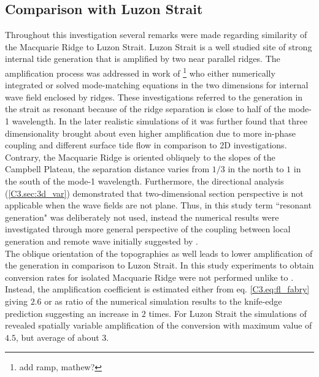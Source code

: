 \documentclass[12pt]{article}
\begin{document}
\subsection{Comparison with Luzon Strait}
\label{C3.sec:disc_luzon}
Throughout this investigation several remarks were made regarding similarity of the Macquarie Ridge 
to Luzon Strait. Luzon Strait is a well studied site of strong internal tide generation that is 
amplified by two near parallel ridges. The amplification process was addressed in work of 
\citep{buijsman2012double, klymak2013parameterizing}\footnote{add ramp, mathew?} who either 
numerically integrated or solved mode-matching equations in the two dimensions for internal wave 
field enclosed by ridges. These  
investigations referred to the generation in the strait as resonant because of the ridge separation 
is close to half of the mode-1 wavelength. In the later realistic simulations 
of \citep{buijsman2014three} it was further found that three dimensionality brought about even 
higher amplification due to more in-phase coupling and different surface tide flow in comparison to 
2D investigations. Contrary, 
the Macquarie Ridge is oriented obliquely to the slopes of the Campbell Plateau, the separation 
distance varies from $1/3$ in the north to $1$ in the south of the mode-1 wavelength. Furthermore, 
the directional analysis (\ref{C3.sec:3d_var}) demonstrated that two-dimensional section 
perspective is not applicable when the wave fields are not plane. Thus, in this study term 
``resonant generation" was deliberately not used, instead the numerical results were investigated 
through more general perspective of the coupling between local generation and remote wave initially 
suggested by \citep{Kelly2010a}.\\

The oblique orientation of the topographies as well leads to lower amplification of the 
generation in comparison to Luzon Strait. In this study experiments to obtain conversion rates for 
isolated Macquarie Ridge were not performed unlike to \citep{buijsman2014three}. Instead, the 
amplification coefficient is estimated either from eq. \eqref{C3.eq:fl_fabry} giving $2.6$ or as 
ratio of the numerical simulation results to the knife-edge prediction  
suggesting an increase in $2$ times. For Luzon Strait the simulations of \citep{buijsman2014three} 
revealed spatially variable amplification of the conversion with maximum value of $4.5$, but 
average of about $3$.\\
\end{document}
